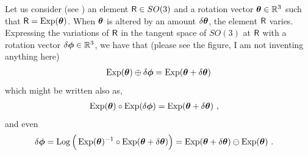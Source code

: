 Let us consider (see ) an element $\sR\in SO(3)$ and a rotation vector $\bth\in\bbR^3$ such that $\sR=\Exp(\bth)$. When $\bth$ is altered by an amount $\dth$, the element $\sR$ varies. Expressing the variations of $\sR$ in the tangent space of $SO(3)$ at $\sR$ with a rotation vector $\delta\bfphi\in\bbR^3$, we have that (please see the figure, I am not inventing anything here)
%
\begin{align}
\Exp(\bth)\oplus\delta\bfphi = \Exp(\bth+\dth)
\end{align}
%
which might be written also as,
%
\begin{align}
\Exp(\bth)\circ\Exp(\delta\bfphi) &= \Exp(\bth+\dth)
~,
\end{align}
%
and even
%
\begin{align}
\delta\bfphi &= \Log\Big(\Exp(\bth)\inv\circ\Exp(\bth+\dth)\Big) = \Exp(\bth+\dth) \ominus \Exp(\bth)
~.
\end{align}


